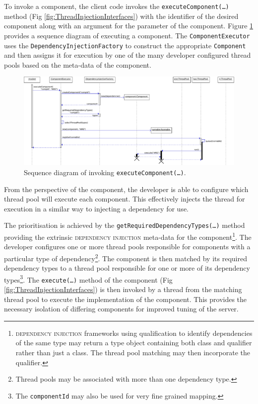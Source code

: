 \documentclass[prodmode]{style/acmlarge}
\begin{document}
To invoke a component, the client code invokes the
\texttt{executeComponent(\ldots)} method (Fig
\ref{fig:ThreadInjectionInterfaces}) with the identifier of the desired
component along with an argument for the parameter of the component.
Figure \ref{fig:ExecuteComponentSequenceDiagram} provides a sequence diagram of
executing a component.  The \texttt{ComponentExecutor} uses the
\texttt{DependencyInjectionFactory} to construct the appropriate
\texttt{Component} and then assigns it for execution by one of the many
developer configured thread pools based on the meta-data of the component.

\begin{figure}[!t]
\centering
\includegraphics[width=6in]{ExecuteComponentSequenceDiagram}
\caption{Sequence diagram of invoking \texttt{executeComponent(\ldots)}.}
\label{fig:ExecuteComponentSequenceDiagram}
\end{figure}

From the perspective of the component, the developer is able to configure which
thread pool will execute each component.  This effectively injects the thread
for execution in a similar way to injecting a dependency for use.

The prioritisation is achieved by the
\texttt{getRequiredDependencyTypes(\ldots)} method providing the extrinsic
\textsc{dependency injection} \cite{ioc} meta-data for the
component\footnote{\textsc{dependency injection} frameworks using qualification to
identify dependencies of the same type may return a type object containing both
class and qualifier rather than just a class.  The thread pool matching may then
incorporate the qualifier.}.  The developer configures one or more thread pools
responsible for components with a particular type of dependency\footnote{Thread
pools may be associated with more than one dependency type.}.  The component is
then matched by its required dependency types to a thread pool responsible for
one or more of its dependency types\footnote{The \texttt{componentId} may also
be used for very fine grained mapping.}.  The \texttt{execute(\ldots)} method of
the component (Fig \ref{fig:ThreadInjectionInterfaces}) is then invoked by a thread
from the matching thread pool to execute the implementation of the component.
This provides the necessary isolation of differing components for improved tuning
of the server.
\end{document}
